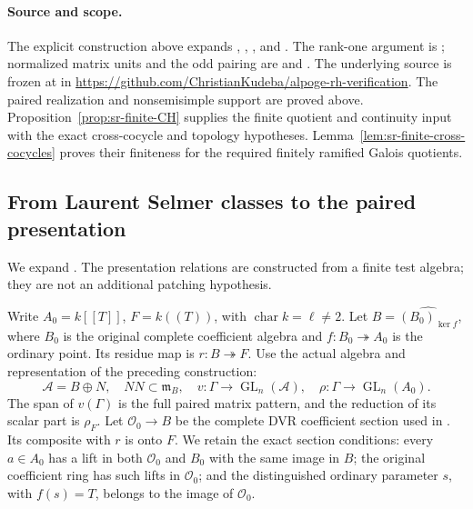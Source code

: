 \paragraph{Source and scope.}
The explicit construction above expands
,
, , and
.
The rank-one argument is
; normalized
matrix units and the odd pairing are
 and
.
The underlying source is frozen at
 in
\url{https://github.com/ChristianKudeba/alpoge-rh-verification}.
The paired realization and nonsemisimple support are proved above.
Proposition~\ref{prop:sr-finite-CH} supplies the finite quotient and
continuity input with the exact cross-cocycle and topology hypotheses.
Lemma~\ref{lem:sr-finite-cross-cocycles} proves their finiteness for
the required finitely ramified Galois quotients.

\subsection{From Laurent Selmer classes to the paired presentation}
\label{sec:selmer-paired-presentation}

We expand .  The presentation
relations are constructed from a finite test algebra; they are
not an additional patching hypothesis.

Write $A_0=k[[T]]$, $F=k((T))$, with $\operatorname{char}k=\ell\ne2$.
Let $B=\widehat{(B_0)_{\ker f}}$, where $B_0$ is the original
complete coefficient algebra and $f:B_0\twoheadrightarrow A_0$
is the ordinary point.  Its residue map is $r:B\twoheadrightarrow F$.
Use the actual algebra and representation of the preceding
construction:
\[
 \mathcal A=B\oplus N,\quad NN\subset\mathfrak m_B,\quad
 v:\Gamma\longrightarrow\operatorname{GL}_n(\mathcal A),\quad
 \rho:\Gamma\longrightarrow\operatorname{GL}_n(A_0).
\]
The span of $v(\Gamma)$ is the full paired matrix pattern, and
the reduction of its scalar part is $\rho_F$.
Let $\mathcal O_0\to B$ be the complete DVR coefficient section
used in .  Its composite with $r$ is onto $F$.
We retain the exact section conditions: every $a\in A_0$ has a
lift in both $\mathcal O_0$ and $B_0$ with the same image in $B$;
the original coefficient ring has such lifts in $\mathcal O_0$;
and the distinguished ordinary parameter $s$, with $f(s)=T$,
belongs to the image of $\mathcal O_0$.

